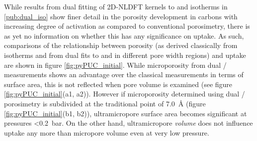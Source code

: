 While results from dual fitting of 2D-NLDFT kernels to  and  isotherms in \ref{pub:dual_iso} show finer detail in the porosity development in carbons with increasing degree of activation as compared to conventional  porosimetry, there is as yet no information on whether this has any significance on  uptake. As such, comparisons of the relationship between porosity (as derived classically from  isotherms and from dual fits to  and  in different pore width regions) and  uptake are shown in figure \ref{fig:pyPUC_initial}. While microporosity from dual / measurements shows an advantage over the classical measurements in terms of surface area, this is not reflected when pore volume is examined (see figure \ref{fig:pyPUC_initial}(a1, a2)). However if microporosity determined using dual / porosimetry is subdivided at the traditional point of \qty{7.0}{\angstrom} (figure \ref{fig:pyPUC_initial}(b1, b2)), \gls{ultramicropore} surface area becomes significant at pressures \qty{<0.2}{\bar}. On the other hand, \gls{ultramicropore} \textit{volume} does not influence  uptake any more than \gls{micropore} volume even at very low pressure.

